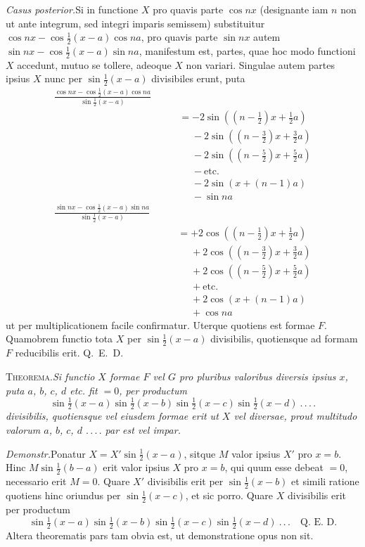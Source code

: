\textit{Casus posterior.}\quad Si in functione $X$ pro quavis parte $\cos nx$ (designante iam $n$ non ut ante integrum, sed integri imparis semissem) substituitur $\cos nx-\cos\tfrac12(x-a)\cos na$, pro quavis parte $\sin nx$ autem $\sin nx-\cos\tfrac12(x-a)\sin na$, manifestum est, partes, quae hoc modo functioni $X$ accedunt, mutuo se tollere, adeoque $X$ non variari. Singulae autem partes ipsius $X$ nunc per $\sin\tfrac12(x-a)$ divisibiles erunt, puta
\[
\begin{aligned}
\frac{\cos nx-\cos\tfrac12(x-a)\cos na}{\sin\tfrac12(x-a)}\qquad\\[5pt]&=-2\sin((n-\tfrac12)x+\tfrac12a)\\[5pt]
&\phantom{=}{-}2\sin((n-\tfrac32)x+\tfrac32a)\\[5pt]
&\phantom{=}{-}2\sin((n-\tfrac52)x+\tfrac52a)\\[5pt]
&\phantom{=}{-}\text{etc.}\\[5pt]
&\phantom{=}{-}2\sin(x+(n-1)a)\\[5pt]
&\phantom{=}{-}\sin na
\end{aligned}
\]
\[
\begin{aligned}
\frac{\sin nx-\cos\tfrac12(x-a)\sin na}{\sin\tfrac12(x-a)}\qquad\\[5pt]&=+2\cos((n-\tfrac12)x+\tfrac12a)\\[5pt]
&\phantom{=}{+}2\cos((n-\tfrac32)x+\tfrac32a)\\[5pt]
&\phantom{=}{+}2\cos((n-\tfrac52)x+\tfrac52a)\\[5pt]
&\phantom{=}{+}\text{etc.}\\[5pt]
&\phantom{=}{+}2\cos(x+(n-1)a)\\[5pt]
&\phantom{=}{+}\cos na
\end{aligned}
\]
ut per multiplicationem facile confirmatur. Uterque quotiens est formae $F$. Quamobrem functio tota $X$ per $\sin\tfrac12(x-a)$ divisibilis, quotiensque ad formam $F$ reducibilis erit. Q.~E.~D.

\textsc{Theorema.}\quad\textit{Si functio $X$ formae $F$ vel $G$ pro pluribus valoribus diversis ipsius $x$, puta $a$, $b$, $c$, $d$ etc. fit $=0$, per productum}
\[
\sin\tfrac12(x-a)\sin\tfrac12(x-b)\sin\tfrac12(x-c)\sin\tfrac12(x-d)\ .\,.\,.\,.
\]
\textit{divisibilis, quotiensque vel eiusdem formae erit ut $X$ vel diversae, prout multitudo valorum $a$, $b$, $c$, $d$ $.\,.\,.\,.$ par est vel impar.}

\textit{Demonstr.}\quad Ponatur $X=X'\sin\tfrac12(x-a)$, sitque $M$ valor ipsius $X'$ pro $x=b$. Hinc $M\sin\tfrac12(b-a)$ erit valor ipsius $X$ pro $x=b$, qui quum esse debeat $=0$, necessario erit $M=0$. Quare $X'$ divisibilis erit per $\sin\tfrac12(x-b)$ et simili ratione quotiens hinc oriundus per $\sin\tfrac12(x-c)$, et sic porro. Quare $X$ divisibilis erit per productum
\[
\sin\tfrac12(x-a)\sin\tfrac12(x-b)\sin\tfrac12(x-c)\sin\tfrac12(x-d)\ .\,.\,.\quad\text{Q.~E.~D.}
\]
Altera theorematis pars tam obvia est, ut demonstratione opus non sit.

